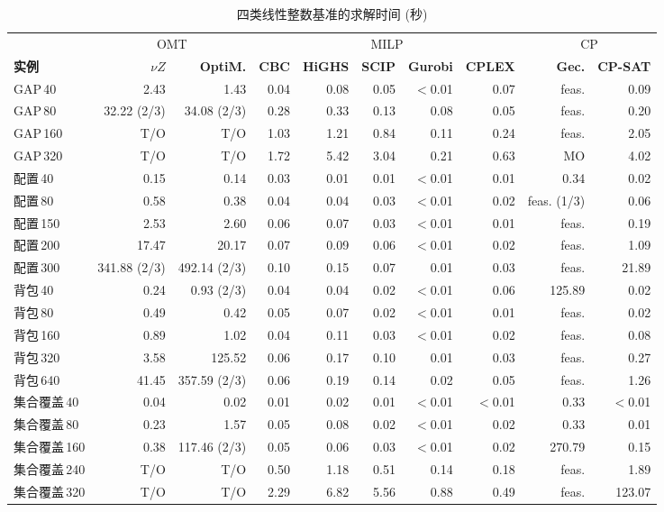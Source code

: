 \begin{table}[!htbp]
\centering
\caption{四类线性整数基准的求解时间 (秒)}
\label{tab:exp-sep}
\small
\setlength{\tabcolsep}{4pt}
\begin{tabular}{@{}l rr rrrrr rr@{}}
\toprule
& \multicolumn{2}{c}{OMT} & \multicolumn{5}{c}{MILP} & \multicolumn{2}{c}{CP} \\
\cmidrule(lr){2-3}\cmidrule(lr){4-8}\cmidrule(lr){9-10}
\textbf{实例} & \textbf{$\nu Z$} & \textbf{OptiM.} & \textbf{CBC} & \textbf{HiGHS} & \textbf{SCIP} & \textbf{Gurobi} & \textbf{CPLEX} & \textbf{Gec.} & \textbf{CP-SAT} \\
\midrule
GAP\,40 & 2.43 & 1.43 & 0.04 & 0.08 & 0.05 & $<$0.01 & 0.07 & feas. & 0.09 \\
GAP\,80 & 32.22 (2/3) & 34.08 (2/3) & 0.28 & 0.33 & 0.13 & 0.08 & 0.05 & feas. & 0.20 \\
GAP\,160 & T/O & T/O & 1.03 & 1.21 & 0.84 & 0.11 & 0.24 & feas. & 2.05 \\
GAP\,320 & T/O & T/O & 1.72 & 5.42 & 3.04 & 0.21 & 0.63 & MO & 4.02 \\
\midrule
配置\,40 & 0.15 & 0.14 & 0.03 & 0.01 & 0.01 & $<$0.01 & 0.01 & 0.34 & 0.02 \\
配置\,80 & 0.58 & 0.38 & 0.04 & 0.04 & 0.03 & $<$0.01 & 0.02 & feas. (1/3) & 0.06 \\
配置\,150 & 2.53 & 2.60 & 0.06 & 0.07 & 0.03 & $<$0.01 & 0.01 & feas. & 0.19 \\
配置\,200 & 17.47 & 20.17 & 0.07 & 0.09 & 0.06 & $<$0.01 & 0.02 & feas. & 1.09 \\
配置\,300 & 341.88 (2/3) & 492.14 (2/3) & 0.10 & 0.15 & 0.07 & 0.01 & 0.03 & feas. & 21.89 \\
\midrule
背包\,40 & 0.24 & 0.93 (2/3) & 0.04 & 0.04 & 0.02 & $<$0.01 & 0.06 & 125.89 & 0.02 \\
背包\,80 & 0.49 & 0.42 & 0.05 & 0.07 & 0.02 & $<$0.01 & 0.01 & feas. & 0.02 \\
背包\,160 & 0.89 & 1.02 & 0.04 & 0.11 & 0.03 & $<$0.01 & 0.02 & feas. & 0.08 \\
背包\,320 & 3.58 & 125.52 & 0.06 & 0.17 & 0.10 & 0.01 & 0.03 & feas. & 0.27 \\
背包\,640 & 41.45 & 357.59 (2/3) & 0.06 & 0.19 & 0.14 & 0.02 & 0.05 & feas. & 1.26 \\
\midrule
集合覆盖\,40 & 0.04 & 0.02 & 0.01 & 0.02 & 0.01 & $<$0.01 & $<$0.01 & 0.33 & $<$0.01 \\
集合覆盖\,80 & 0.23 & 1.57 & 0.05 & 0.08 & 0.02 & $<$0.01 & 0.02 & 0.33 & 0.01 \\
集合覆盖\,160 & 0.38 & 117.46 (2/3) & 0.05 & 0.06 & 0.03 & $<$0.01 & 0.02 & 270.79 & 0.15 \\
集合覆盖\,240 & T/O & T/O & 0.50 & 1.18 & 0.51 & 0.14 & 0.18 & feas. & 1.89 \\
集合覆盖\,320 & T/O & T/O & 2.29 & 6.82 & 5.56 & 0.88 & 0.49 & feas. & 123.07 \\
\bottomrule
\end{tabular}
\end{table}
